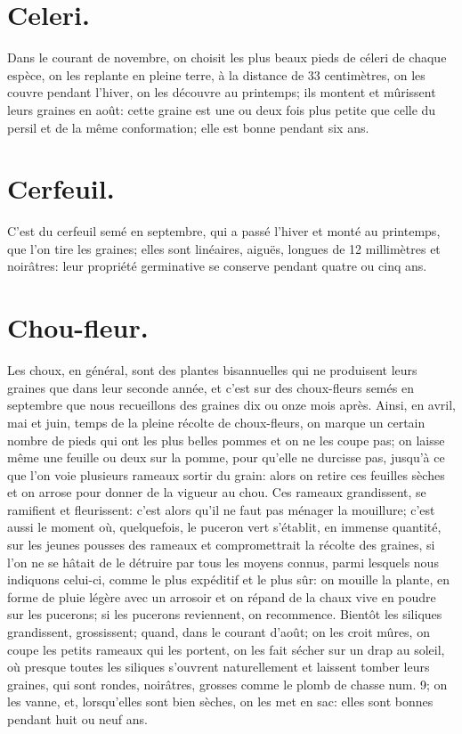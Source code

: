\documentclass[10pt,a4paper]{book}
\begin{document}
\section{Celeri.}

Dans le courant de novembre, on choisit les plus beaux pieds de céleri de chaque espèce, on les replante en pleine terre, à la distance de 33 centimètres, on les couvre pendant l'hiver, on les découvre au printemps; ils montent et mûrissent leurs graines en août: cette graine est une ou deux fois plus petite que celle du persil et de la même conformation; elle est bonne pendant six ans.

\section{Cerfeuil.}

C'est du cerfeuil semé en septembre, qui a passé l'hiver et monté au printemps, que l'on tire les graines; elles sont linéaires, aiguës, longues de 12 millimètres et noirâtres: leur propriété germinative se conserve pendant quatre ou cinq ans.

\section{Chou-fleur.}

Les choux, en général, sont des plantes bisannuelles qui ne produisent leurs graines que dans leur seconde année, et c'est sur des choux-fleurs semés en septembre que nous recueillons des graines dix ou onze mois après. Ainsi, en avril, mai et juin, temps de la pleine récolte de choux-fleurs, on marque un certain nombre de pieds qui ont les plus belles pommes et on ne les coupe pas; on laisse même une feuille ou deux sur la pomme, pour qu'elle ne durcisse pas, jusqu'à ce que l'on voie plusieurs rameaux sortir du grain: alors on retire ces feuilles sèches et on arrose pour donner de la vigueur au chou. Ces rameaux grandissent, se ramifient et fleurissent: c'est alors qu'il ne faut pas ménager la mouillure; c'est aussi le moment où, quelquefois, le puceron vert s'établit, en immense quantité, sur les jeunes pousses des rameaux et compromettrait la récolte des graines, si l'on ne se hâtait de le détruire par tous les moyens connus, parmi lesquels nous indiquons celui-ci, comme le plus expéditif et le plus sûr: on mouille la plante, en forme de pluie légère avec un arrosoir et on répand de la chaux vive en poudre sur les pucerons; si les pucerons reviennent, on recommence. Bientôt les siliques grandissent, grossissent; quand, dans le courant d'août; on les croit mûres, on coupe les petits rameaux qui les portent, on les fait sécher sur un drap au soleil, où presque toutes les siliques s'ouvrent naturellement et laissent tomber leurs graines, qui sont rondes, noirâtres, grosses comme le plomb de chasse num. 9; on les vanne, et, lorsqu'elles sont bien sèches, on les met en sac: elles sont bonnes pendant huit ou neuf ans.
\end{document}
